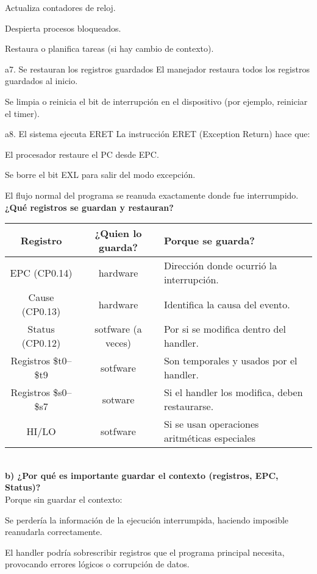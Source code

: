 \documentclass[]{article}
\begin{document}
Actualiza contadores de reloj.

Despierta procesos bloqueados.

Restaura o planifica tareas (si hay cambio de contexto).

 a7. Se restauran los registros guardados
El manejador restaura todos los registros guardados al inicio.

Se limpia o reinicia el bit de interrupción en el dispositivo (por ejemplo, reiniciar el timer).

 a8. El sistema ejecuta ERET
La instrucción ERET (Exception Return) hace que:

El procesador restaure el PC desde EPC.

Se borre el bit EXL para salir del modo excepción.

El flujo normal del programa se reanuda exactamente donde fue interrumpido. \\

\textbf{¿Qué registros se guardan y restauran?} \\

\begin{tabular}{|c|c|p{4.5cm}|}
	\hline
	Registro & ¿Quien lo guarda? & Porque se guarda? \\
	\hline
	EPC (CP0.14) & hardware & Dirección donde ocurrió la interrupción. \\
	\hline
	Cause (CP0.13) & hardware & Identifica la causa del evento. \\
	\hline
	Status (CP0.12) & sotfware (a veces) & Por si se modifica dentro del handler. \\
	\hline
	Registros \$t0–\$t9 & sotfware & Son temporales y usados por el handler. \\
	\hline
	Registros \$s0–\$s7 & sotware & Si el handler los modifica, deben restaurarse. \\
	\hline
	HI/LO & sotfware & Si se usan operaciones aritméticas especiales \\
	\hline
\end{tabular} \\

\textbf{b) ¿Por qué es importante guardar el contexto (registros, EPC, Status)?} \\
Porque sin guardar el contexto:

Se perdería la información de la ejecución interrumpida, haciendo imposible reanudarla correctamente.

El handler podría sobrescribir registros que el programa principal necesita, provocando errores lógicos o corrupción de datos.
\end{document}

